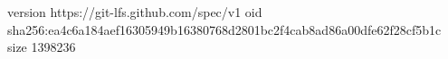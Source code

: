 version https://git-lfs.github.com/spec/v1
oid sha256:ea4c6a184aef16305949b16380768d2801bc2f4cab8ad86a00dfe62f28cf5b1c
size 1398236
